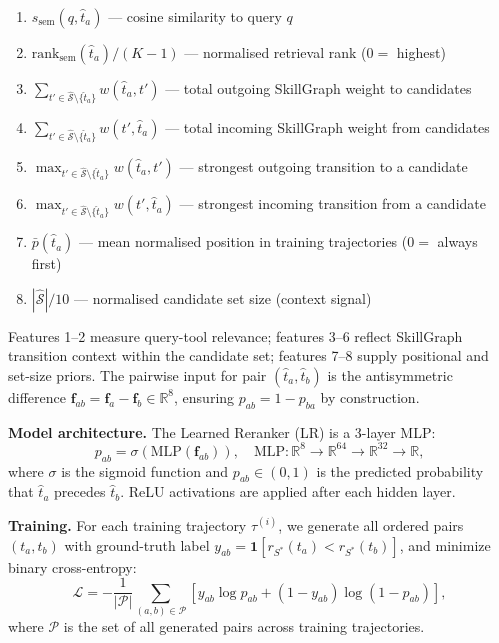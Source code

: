 \documentclass[lettersize,journal]{IEEEtran}
\begin{document}
\begin{enumerate}
    \item $s_{\text{sem}}(q, \hat{t}_a)$ — cosine similarity to query $q$
    \item $\text{rank}_{\text{sem}}(\hat{t}_a) / (K{-}1)$ — normalised retrieval rank ($0 =$ highest)
    \item $\textstyle\sum_{t' \in \hat{\mathcal{S}} \setminus \{\hat{t}_a\}} w(\hat{t}_a, t')$ — total outgoing SkillGraph weight to candidates
    \item $\textstyle\sum_{t' \in \hat{\mathcal{S}} \setminus \{\hat{t}_a\}} w(t', \hat{t}_a)$ — total incoming SkillGraph weight from candidates
    \item $\max_{t' \in \hat{\mathcal{S}} \setminus \{\hat{t}_a\}} w(\hat{t}_a, t')$ — strongest outgoing transition to a candidate
    \item $\max_{t' \in \hat{\mathcal{S}} \setminus \{\hat{t}_a\}} w(t', \hat{t}_a)$ — strongest incoming transition from a candidate
    \item $\bar{p}(\hat{t}_a)$ — mean normalised position in training trajectories ($0 =$ always first)
    \item $|\hat{\mathcal{S}}| / 10$ — normalised candidate set size (context signal)
\end{enumerate}
Features 1--2 measure query-tool relevance; features 3--6 reflect SkillGraph transition context within the candidate set; features 7--8 supply positional and set-size priors.
The pairwise input for pair $(\hat{t}_a, \hat{t}_b)$ is the antisymmetric difference $\mathbf{f}_{ab} = \mathbf{f}_a - \mathbf{f}_b \in \mathbb{R}^8$, ensuring $p_{ab} = 1 - p_{ba}$ by construction.

\textbf{Model architecture.}
The Learned Reranker (LR) is a 3-layer MLP:
\begin{equation}
    p_{ab} = \sigma\!\left(\text{MLP}(\mathbf{f}_{ab})\right), \quad
    \text{MLP}: \mathbb{R}^8 \to \mathbb{R}^{64} \to \mathbb{R}^{32} \to \mathbb{R},
    \label{eq:mlp}
\end{equation}
where $\sigma$ is the sigmoid function and $p_{ab} \in (0,1)$ is the predicted probability that $\hat{t}_a$ precedes $\hat{t}_b$.
ReLU activations are applied after each hidden layer.

\textbf{Training.}
For each training trajectory $\tau^{(i)}$, we generate all ordered pairs $(t_a, t_b)$ with ground-truth label $y_{ab} = \mathbf{1}[r_{S^*}(t_a) < r_{S^*}(t_b)]$, and minimize binary cross-entropy:
\begin{equation}
    \mathcal{L} = -\frac{1}{|\mathcal{P}|} \sum_{(a,b) \in \mathcal{P}} \left[ y_{ab} \log p_{ab} + (1 - y_{ab}) \log(1 - p_{ab}) \right],
    \label{eq:loss}
\end{equation}
where $\mathcal{P}$ is the set of all generated pairs across training trajectories.
\end{document}
